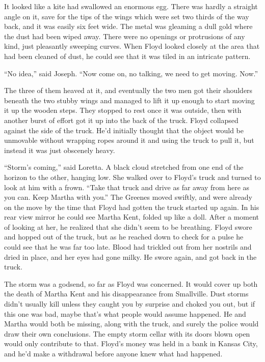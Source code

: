 \documentclass[ebook,12pt]{memoir}
\begin{document}
It looked like a kite had swallowed an enormous egg. There was hardly a
straight angle on it, save for the tips of the wings which were set two
thirds of the way back, and it was easily six feet wide. The metal was
gleaming a dull gold where the dust had been wiped away. There were no
openings or protrusions of any kind, just pleasantly sweeping curves.
When Floyd looked closely at the area that had been cleaned of dust, he
could see that it was tiled in an intricate pattern.

``No idea,'' said Joseph. ``Now come on, no talking, we need to get
moving. Now.''

The three of them heaved at it, and eventually the two men got their
shoulders beneath the two stubby wings and managed to lift it up enough
to start moving it up the wooden steps. They stopped to rest once it was
outside, then with another burst of effort got it up into the back of
the truck. Floyd collapsed against the side of the truck. He'd initially
thought that the object would be unmovable without wrapping ropes around
it and using the truck to pull it, but instead it was just obscenely
heavy.

``Storm's coming,'' said Loretta. A black cloud stretched from one end
of the horizon to the other, hanging low. She walked over to Floyd's
truck and turned to look at him with a frown. ``Take that truck and
drive as far away from here as you can. Keep Martha with you.'' The
Greenes moved swiftly, and were already on the move by the time that
Floyd had gotten the truck started up again. In his rear view mirror he
could see Martha Kent, folded up like a doll. After a moment of looking
at her, he realized that she didn't seem to be breathing. Floyd swore
and hopped out of the truck, but as he reached down to check for a pulse
he could see that he was far too late. Blood had trickled out from her
nostrils and dried in place, and her eyes had gone milky. He swore
again, and got back in the truck.

The storm was a godsend, so far as Floyd was concerned. It would cover
up both the death of Martha Kent and his disappearance from Smallville.
Dust storms didn't usually kill unless they caught you by surprise and
choked you out, but if this one was bad, maybe that's what people would
assume happened. He and Martha would both be missing, along with the
truck, and surely the police would draw their own conclusions. The empty
storm cellar with its doors blown open would only contribute to that.
Floyd's money was held in a bank in Kansas City, and he'd make a
withdrawal before anyone knew what had happened.
\end{document}
